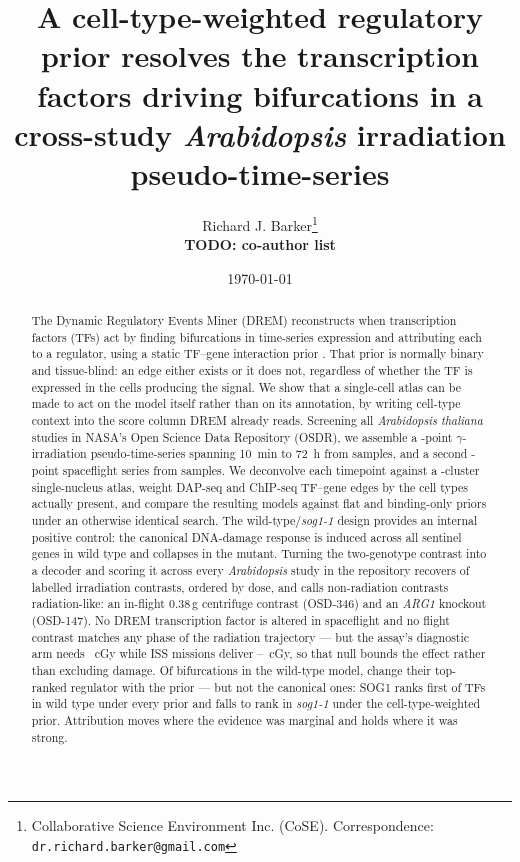\documentclass[11pt,a4paper]{article}
\title{A cell-type-weighted regulatory prior resolves the transcription factors
driving bifurcations in a cross-study \textit{Arabidopsis} irradiation
pseudo-time-series}
\author{Richard J. Barker\thanks{Collaborative Science Environment Inc. (CoSE).
Correspondence: \texttt{dr.richard.barker@gmail.com}} \\
\small \textbf{TODO: co-author list}}
\date{\today}
\begin{document}
\maketitle

\begin{abstract}
The Dynamic Regulatory Events Miner (DREM) reconstructs when transcription factors (TFs)
act by finding bifurcations in time-series expression and attributing each to a
regulator, using a static TF--gene interaction prior \citep{ernst2007drem,schulz2012drem2}.
That prior is normally binary and tissue-blind: an edge either exists or it does not,
regardless of whether the TF is expressed in the cells producing the signal. We show
that a single-cell atlas can be made to act on the model itself rather than on its
annotation, by writing cell-type context into the score column DREM already reads.
Screening all \NumArabidopsisStudiesScreened{} \textit{Arabidopsis thaliana} studies in
NASA's Open Science Data Repository (OSDR), we assemble a
\NumCohortATimepoints{}-point $\gamma$-irradiation pseudo-time-series spanning 10~min to
72~h from \NumCohortATimedSamples{} samples, and a second
\NumCohortBTimepoints{}-point spaceflight series from \NumCohortBSamples{} samples. We
deconvolve each timepoint against a \NumAtlasClusters{}-cluster single-nucleus atlas,
weight \NumPriorEdges{} DAP-seq and ChIP-seq TF--gene edges by the cell types actually
present, and compare the resulting models against flat and binding-only priors under an
otherwise identical search. The wild-type/\textit{sog1-1} design provides an internal
positive control: the canonical DNA-damage response is induced across all
\NumSentinelsResponding{} sentinel genes in wild type and collapses in the mutant.
Turning the two-genotype contrast into a decoder and scoring it across every
\textit{Arabidopsis} study in the repository recovers \NumPositivesDetected{} of
\NumLabelledPositives{} labelled irradiation contrasts, ordered by dose, and calls
\NumNovelRadiationCalls{} non-radiation contrasts radiation-like: an in-flight 0.38\,g
centrifuge contrast (OSD-346) and an \textit{ARG1} knockout (OSD-147).
No DREM transcription factor is altered in spaceflight and no flight contrast matches any
phase of the radiation trajectory --- but the assay's diagnostic arm needs
\DoseDetected{}~cGy while ISS missions deliver \IssDoseLo{}--\IssDoseHi{}~cGy, so that
null bounds the effect rather than excluding damage.
Of \NumAblationSplits{} bifurcations in the wild-type model,
\NumAblationSplitsChanged{} change their top-ranked regulator with the prior --- but not
the canonical ones: SOG1 ranks first of \NumTFsRanked{} TFs in wild type under every
prior and falls to rank \SogOneTfRankMutWeighted{} in \textit{sog1-1} under the
cell-type-weighted prior. Attribution moves
where the evidence was marginal and holds where it was strong.
\end{abstract}
\end{document}
